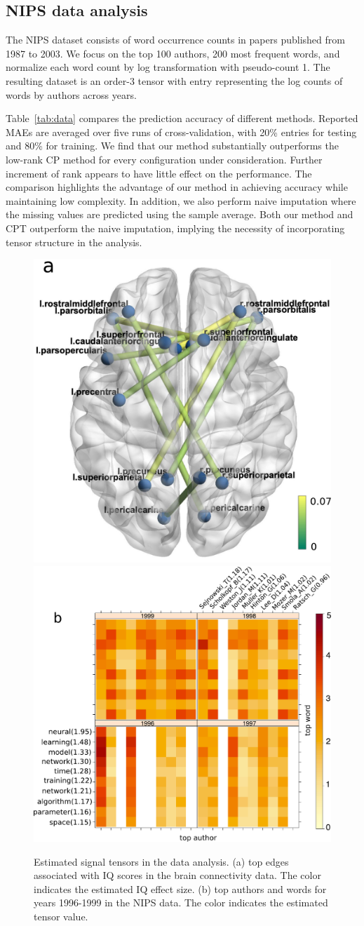 \documentclass[11pt]{article}
\theoremstyle{plain}
\theoremstyle{definition}
\begin{document}
\subsection{NIPS data analysis}

The NIPS dataset consists of word occurrence counts in papers published from 1987 to 2003. We focus on the top 100 authors, 200 most frequent words, and normalize each word count by log transformation with pseudo-count 1. The resulting dataset is an order-3 tensor with entry representing the log counts of words by authors across years. 


Table~\ref{tab:data} compares the prediction accuracy of different methods. Reported MAEs are averaged over five runs of cross-validation, with 20\% entries for testing and 80\% for training. We find that our method substantially outperforms the low-rank CP method for every configuration under consideration. Further increment of rank appears to have little effect on the performance. 
The comparison highlights the advantage of our method in achieving accuracy while maintaining low complexity. In addition, we also perform naive imputation where the missing values are predicted using the sample average. Both our method and CPT outperform the naive imputation, implying the necessity of incorporating tensor structure in the analysis.

\begin{figure}[h!]
\centering
\includegraphics[width=.37\textwidth]{figure/brainIQ.pdf}
\hspace{1cm}
\includegraphics[width=.495\textwidth]{figure/signal.pdf}
\caption{Estimated signal tensors in the data analysis. (a) top edges associated with IQ scores in the brain connectivity data. The color indicates the estimated IQ effect size. (b) top authors and words for years 1996-1999 in the NIPS data. The color indicates the estimated tensor value. 
}\label{fig:signal}
\end{figure}
\end{document}
